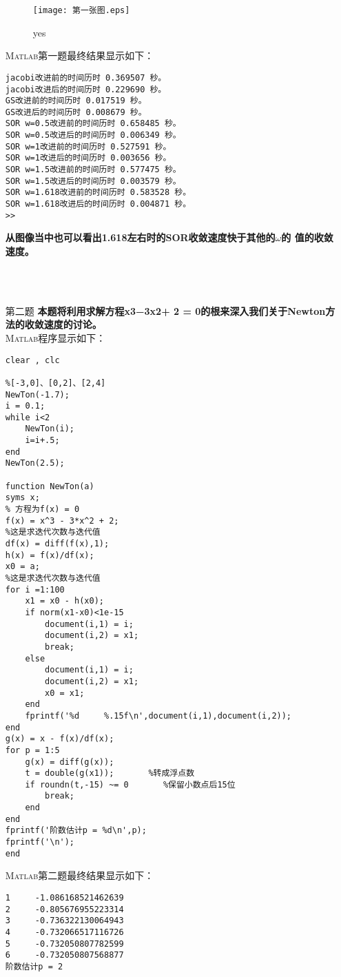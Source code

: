 \documentclass[12pt,a4paper,utf8]{ctexart}
\begin{document}
\begin{enumerate}
\begin{figure}  \centering  \texttt{[image: 第一张图.eps]}  \caption{yes}  \label{1}  \end{figure}  

\textsc{Matlab}第一题最终结果显示如下：
\begin{lstlisting}[frame=single]
jacobi改进前的时间历时 0.369507 秒。
jacobi改进后的时间历时 0.229690 秒。
GS改进前的时间历时 0.017519 秒。
GS改进后的时间历时 0.008679 秒。
SOR w=0.5改进前的时间历时 0.658485 秒。
SOR w=0.5改进后的时间历时 0.006349 秒。
SOR w=1改进前的时间历时 0.527591 秒。
SOR w=1改进后的时间历时 0.003656 秒。
SOR w=1.5改进前的时间历时 0.577475 秒。
SOR w=1.5改进后的时间历时 0.003579 秒。
SOR w=1.618改进前的时间历时 0.583528 秒。
SOR w=1.618改进后的时间历时 0.004871 秒。
>> 
\end{lstlisting}
\textcolor[rgb]{.3,.3,.7}
{\bfseries 从图像当中也可以看出1.618左右时的SOR收敛速度快于其他的$\omega$的
值的收敛速度。}

~\\
~\\
\newpage

\item[第二题]
\textbf{本题将利用求解方程x3−3x2+ 2 = 0的根来深入我们关于Newton方法的收敛速度的讨论。} \\
\textsc{Matlab}程序显示如下：
\begin{lstlisting}[frame=single]
clear , clc

%[-3,0]、[0,2]、[2,4]
NewTon(-1.7);
i = 0.1;
while i<2
    NewTon(i);
    i=i+.5;
end
NewTon(2.5);

function NewTon(a)
syms x;
% 方程为f(x) = 0
f(x) = x^3 - 3*x^2 + 2;
%这是求迭代次数与迭代值
df(x) = diff(f(x),1);
h(x) = f(x)/df(x);
x0 = a;
%这是求迭代次数与迭代值
for i =1:100
    x1 = x0 - h(x0);
    if norm(x1-x0)<1e-15
        document(i,1) = i;
        document(i,2) = x1;
        break;
    else
        document(i,1) = i;
        document(i,2) = x1;
        x0 = x1;
    end
    fprintf('%d     %.15f\n',document(i,1),document(i,2));
end
g(x) = x - f(x)/df(x); 
for p = 1:5          
    g(x) = diff(g(x));
    t = double(g(x1));       %转成浮点数
    if roundn(t,-15) ~= 0       %保留小数点后15位
        break;
    end
end
fprintf('阶数估计p = %d\n',p);
fprintf('\n');
end
\end{lstlisting}
\textsc{Matlab}第二题最终结果显示如下：
\begin{lstlisting}[frame=single]
1     -1.086168521462639
2     -0.805676955223314
3     -0.736322130064943
4     -0.732066517116726
5     -0.732050807782599
6     -0.732050807568877
阶数估计p = 2


\end{lstlisting}
\end{enumerate}
\end{document}
